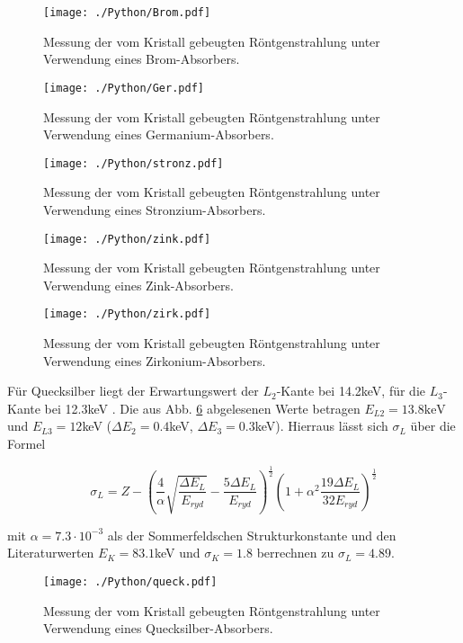 \begin{figure}
  \centering
  \texttt{[image: ./Python/Brom.pdf]}
  \caption{Messung der vom Kristall gebeugten Röntgenstrahlung unter Verwendung eines Brom-Absorbers.}
  \label{fig:brom}
\end{figure}


\begin{figure}
  \centering
  \texttt{[image: ./Python/Ger.pdf]}
  \caption{Messung der vom Kristall gebeugten Röntgenstrahlung unter Verwendung eines Germanium-Absorbers.}
  \label{fig:ger}
\end{figure}


\begin{figure}
  \centering
  \texttt{[image: ./Python/stronz.pdf]}
  \caption{Messung der vom Kristall gebeugten Röntgenstrahlung unter Verwendung eines Stronzium-Absorbers.}
  \label{fig:stronz}
\end{figure}



\begin{figure}
  \centering
  \texttt{[image: ./Python/zink.pdf]}
  \caption{Messung der vom Kristall gebeugten Röntgenstrahlung unter Verwendung eines Zink-Absorbers.}
  \label{fig:zink}
\end{figure}



\begin{figure}
  \centering
  \texttt{[image: ./Python/zirk.pdf]}
  \caption{Messung der vom Kristall gebeugten Röntgenstrahlung unter Verwendung eines Zirkonium-Absorbers.}
  \label{fig:brom}
\end{figure}

Für Quecksilber liegt der Erwartungswert der $L_2$-Kante bei 14.2keV, für die $L_3$-Kante bei 12.3keV \cite{skuld}. Die aus Abb. \ref{fig:queck} abgelesenen Werte betragen $E_{L2} = 13.8 \si{\kilo \eV}$ und $E_{L3} = 12$keV ($\Delta E_2 = 0.4$keV, $\Delta E_3 = 0.3$keV).
Hierraus lässt sich $\sigma_L$ über die Formel

\begin{equation}
  \sigma_L = Z - \left(\frac{4}{\alpha}\sqrt{\frac{\Delta E_L}{E_{ryd}}}-\frac{5\Delta E_L}{E_{ryd}}\right)^{\frac{1}{2}} \left(1+\alpha^2   \frac{19\Delta E_L}{32 E_{ryd}}\right)^{\frac{1}{2}}
\end{equation}

mit $\alpha = 7.3 \cdot 10^{-3}$ als der Sommerfeldschen Strukturkonstante und den Literaturwerten $E_K = 83.1$keV \cite{skuld} und $\sigma_K = 1.8$ berrechnen zu $\sigma_L = 4.89$.

\begin{figure}
  \centering
  \texttt{[image: ./Python/queck.pdf]}
  \caption{Messung der vom Kristall gebeugten Röntgenstrahlung unter Verwendung eines Quecksilber-Absorbers.}
  \label{fig:queck}
\end{figure}

